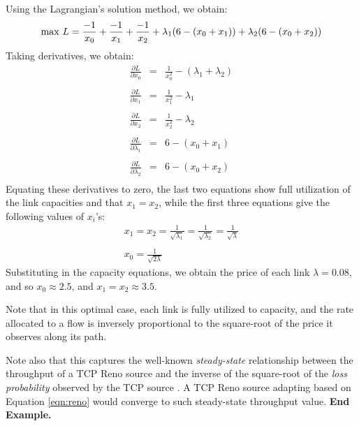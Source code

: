 \documentclass{article}
\begin{document}
Using the Lagrangian's solution method, we obtain:
\begin{eqnarray*}
{\rm max}\ L =  \frac{-1}{x_0} + \frac{-1}{x_1} + \frac{-1}{x_2} + \lambda_1(6- (x_0+x_1)) + \lambda_2(6- (x_0+x_2))
\end{eqnarray*}
Taking derivatives, we obtain:
\[
\begin{array}{ccc}
  \frac{\partial L}{\partial x_0} & =   & \frac{1}{x_0^2} - (\lambda_1+ \lambda_2)   \\ \\
  \frac{\partial L}{\partial x_1} & =   & \frac{1}{x_1^2} - \lambda_1   \\ \\
  \frac{\partial L}{\partial x_2} & =   & \frac{1}{x_2^2} - \lambda_2   \\ \\
  \frac{\partial L}{\partial \lambda_1} & =  & 6 -   (x_0+x_1)\\ \\
  \frac{\partial L}{\partial \lambda_2} & =  & 6 -   (x_0+x_2) \\
\end{array}
\]
Equating these derivatives to zero, the last two equations show full utilization of the link capacities and that $x_1=x_2$, while the first three equations give the following values of $x_i$'s: 
\begin{eqnarray*}
x_1 = x_2 = \frac{1}{\sqrt{\lambda_1}} = \frac{1}{\sqrt{\lambda_2}} = \frac{1}{\sqrt{\lambda}} \\ \\
x_0 = \frac{1}{\sqrt{2 \lambda}}
\end{eqnarray*}
Substituting in the capacity equations, we obtain the price of each link $\lambda = 0.08$,
and so $x_0 \approx 2.5$, and $x_1 = x_2 \approx 3.5 $. 

Note that in this optimal case, each link is fully utilized to capacity, and 
the rate allocated to a flow is inversely proportional to the square-root of the price it observes along its path.

Note also that this captures the well-known {\em steady-state} relationship between the throughput of a TCP Reno source and the inverse of the square-root of the {\em loss probability} observed by the TCP source \cite{tcp-thru:2000}.
A TCP Reno source adapting based on Equation \ref{eqn:reno} would converge to such steady-state throughput value.
{\bf End Example.}\\
\end{document}
